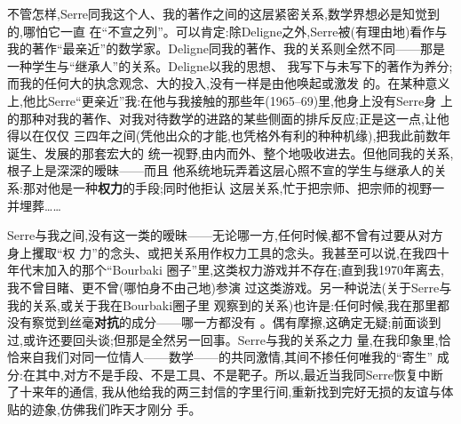 不管怎样,Serre同我这个人、我的著作之间的这层紧密关系,数学界想必是知觉到的,哪怕它一直
在“不宣之列”。可以肯定:除Deligne之外,Serre被(有理由地)看作与我的著作“最亲近”的数学家。Deligne同我的著作、我的关系则全然不同——那是一种学生与“继承人”的关系。Deligne以我的思想、
我写下与未写下的著作为养分;而我的任何大的执念观念、大的投入,没有一样是由他唤起或激发
的。在某种意义上,他比Serre“更亲近”我:在他与我接触的那些年(1965--69)里,他身上没有Serre身
上的那种对我的著作、对我对待数学的进路的某些侧面的排斥反应;正是这一点,让他得以在仅仅\dmark{}
三四年之间(凭他出众的才能,也凭格外有利的种种机缘),把我此前数年诞生、发展的那套宏大的
统一视野,由内而外、整个地吸收进去。但他同我的关系,根子上是深深的暧昧——而且
他系统地玩弄着这层心照不宣的学生与继承人的关系:那对他是一种\textbf{权力}的手段;同时他拒认
这层关系,忙于把宗师、把宗师的视野一并埋葬……

Serre与我之间,没有这一类的暧昧——无论哪一方,任何时候,都不曾有过要从对方身上攫取“权
力”的念头、或把关系用作权力工具的念头。我甚至可以说,在我四十年代末加入的那个“Bourbaki
圈子”里,这类权力游戏并不存在;直到我1970年离去,我不曾目睹、更不曾(哪怕身不由己地)参演
过这类游戏。另一种说法(关于Serre与我的关系,或关于我在Bourbaki圈子里
观察到的关系)也许是:任何时候,我在那里都没有察觉到丝毫\textbf{对抗}的成分——哪一方都没有
。偶有摩擦\dmark{},这确定无疑;前面谈到过,或许还要回头谈;但那是全然另一回事。Serre与我的关系之力
量,在我印象里,恰恰来自我们对同一位情人——数学——的共同激情,其间不掺任何唯我的“寄生”
成分:在其中,对方不是手段、不是工具、不是靶子。所以,最近当我同Serre恢复中断了十来年的通信,
我从他给我的两三封信的字里行间,重新找到完好无损的友谊与体贴的迹象,仿佛我们昨天才刚分
手。

